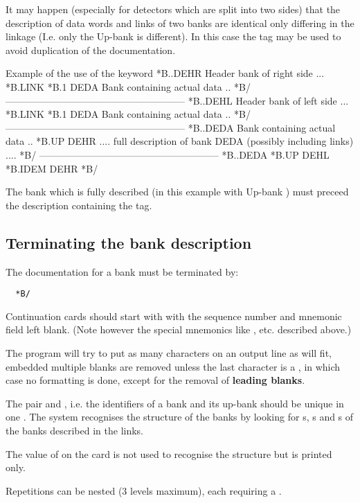 It may happen (especially for detectors which are split into two
sides) that the description of data words and links of two banks are
identical only differing in the linkage 
(I.e. only the Up-bank is different).
In this case the tag  may be used to avoid
duplication of the documentation.
 
\begin{XMPt}{Example of the use of the  keyword}
  *B..DEHR   Header bank of right side
  ...
  *B.LINK
  *B.1    DEDA   Bank containing actual data
  ..
  *B/
  --------------------------------------------------------
  *B..DEHL   Header bank of left side
  ...
  *B.LINK
  *B.1    DEDA   Bank containing actual data
  ..
  *B/
  --------------------------------------------------------
  *B..DEDA  Bank containing actual data
  ..
  *B.UP    DEHR
  ....
  full description of bank DEDA (possibly including links)
  ....
  *B/
  --------------------------------------------------------
  *B..DEDA
  *B.UP      DEHL
  *B.IDEM    DEHR
  *B/
\end{XMPt}
 
The bank which is fully described (in this example  with
Up-bank ) must preceed the description containing the 
 tag.
 
 
\subsection{Terminating the bank description}
 
The documentation for a bank must be terminated by:
\begin{verbatim}
  *B/
\end{verbatim}
 
\begin{Notes}
\item Continuation cards should start with  with the 
      sequence number and mnemonic field
      left blank. (Note however the special mnemonics like 
      ,  etc. described above.)
\item The program will try to put as many characters on an output line 
      as will fit, embedded multiple blanks are removed unless the last 
      character is a , in
      which case no formatting is done, except for the removal of 
      {\bf leading blanks}.
\item The pair  and , i.e. the identifiers of a 
      bank and its up-bank should be unique in one \RZfile. 
      The system recognises the structure of the banks by looking for 
      s, s and s of the banks described 
      in the links. 
\item The value of  on the card 
      is not used to recognise the structure but is printed only.
\item Repetitions can be nested (3 levels maximum), 
      each  requiring a .
\end{Notes}
 
